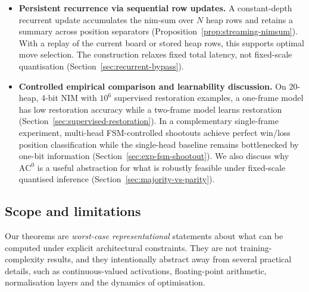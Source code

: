 \documentclass[11pt]{article}
\newcommand{\AC}{\mathrm{AC}}
\theoremstyle{plain}
\theoremstyle{definition}
\theoremstyle{remark}
\numberwithin{equation}{section}
\begin{document}
\begin{itemize}[leftmargin=*]
\item \textbf{Persistent recurrence via sequential row updates.}
A constant-depth recurrent update accumulates the nim-sum over $N$ heap rows and retains a summary across position separators (Proposition~\ref{prop:streaming-nimsum}). With a replay of the current board or stored heap rows, this supports optimal move selection. The construction relaxes fixed total latency, not fixed-scale quantisation (Section~\ref{sec:recurrent-bypass}).

\item \textbf{Controlled empirical comparison and learnability discussion.}
On 20-heap, 4-bit NIM with $10^6$ supervised restoration examples, a one-frame model has low restoration accuracy while a two-frame model learns restoration (Section~\ref{sec:supervised-restoration}).
In a complementary single-frame experiment, multi-head FSM-controlled shootouts achieve perfect win/loss position classification while the single-head baseline remains bottlenecked by one-bit information (Section~\ref{sec:exp-fsm-shootout}).
We also discuss why $\AC^0$ is a useful abstraction for what is robustly feasible under fixed-scale quantised inference (Section~\ref{sec:majority-vs-parity}).
\end{itemize}

\subsection{Scope and limitations}
\label{sec:scope}

Our theorems are \emph{worst-case representational} statements about what can be computed under explicit architectural constraints.
They are not training-complexity results, and they intentionally abstract away from several practical details, such as continuous-valued activations, floating-point arithmetic, normalisation layers and the dynamics of optimisation.
\end{document}
